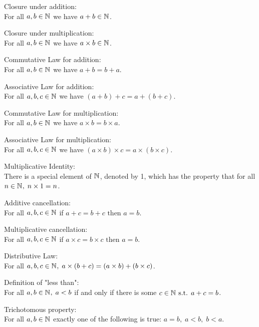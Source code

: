 \documentclass[../MathsNotesBase.tex]{subfiles}
\begin{document}
{		\begin{axiom}{Closure under addition:}\\ For all $a,b \in \mathbb{N}^{}$ we have $a + b \in \mathbb{N}^{}$.	
		\end{axiom}
		\begin{axiom}{Closure under multiplication:}\\ For all $a,b \in \mathbb{N}^{}$ we have $a \times b \in \mathbb{N}^{}$.
		\end{axiom}
		\begin{axiom}{Commutative Law for addition:}\\ For all $a,b \in \mathbb{N}^{}$ we have $a + b = b + a$.
		\end{axiom}
		\begin{axiom}{Associative Law for addition:}\\ For all $a,b,c \in \mathbb{N}^{}$ we have $(a + b) + c = a + (b + c)$.
		\end{axiom}
		\begin{axiom}{Commutative Law for multiplication:}\\ For all $a,b \in \mathbb{N}^{}$ we have $a \times b = b \times a$.
		\end{axiom}
		\begin{axiom}{Associative Law for multiplication:}\\ For all $a,b,c \in \mathbb{N}^{}$ we have $(a \times b) \times c = a \times (b \times c)$.
		\end{axiom}
		\begin{axiom}{Multiplicative Identity:}\\ There is a special element of $\mathbb{N}^{}$, denoted by 1, which has the property that for all $n \in \mathbb{N}^{},\; n \times 1 = n$.
		\end{axiom}
		\begin{axiom}{Additive cancellation:}\\ For all $a,b,c \in \mathbb{N}^{}$ if $a + c = b + c \text{ then } a = b$.
		\end{axiom}
		\begin{axiom}{Multiplicative cancellation:}\\ For all $a,b,c \in \mathbb{N}^{}$ if $a \times c = b \times c \text{ then } a = b$.
		\end{axiom}
		\begin{axiom}{Distributive Law:}\\ For all $a,b,c \in \mathbb{N}^{},\; a \times (b + c) = (a \times b) + (b \times c)$.
		\end{axiom}
		\begin{axiom}{Definition of "less than":}\\ For all $a,b \in \mathbb{N}^{},\; a < b$ if and only if there is some $c \in \mathbb{N}^{} \text{ s.t. } a + c = b$.
		\end{axiom}
		\begin{axiom}{Trichotomous property:}\\ For all $a,b \in \mathbb{N}^{}$ exactly one of the following is true: $a = b,\; a < b,\; b < a$.
		\end{axiom}
	
}
\end{document}
